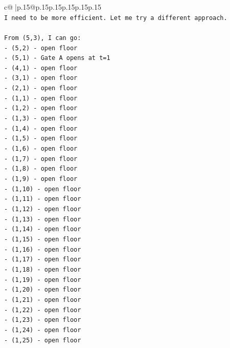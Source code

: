 \documentclass{article}
\begin{document}
{\begin{supertabular}{c@{$\;$}|p{.15\linewidth}@{}p{.15\linewidth}p{.15\linewidth}p{.15\linewidth}p{.15\linewidth}p{.15\linewidth}}
{{{\\ 
\texttt{I need to be more efficient. Let me try a different approach.} \\
\\ 
\texttt{From (5,3), I can go:} \\
\texttt{{-} (5,2) {-} open floor} \\
\texttt{{-} (5,1) {-} Gate A opens at t=1} \\
\texttt{{-} (4,1) {-} open floor} \\
\texttt{{-} (3,1) {-} open floor} \\
\texttt{{-} (2,1) {-} open floor} \\
\texttt{{-} (1,1) {-} open floor} \\
\texttt{{-} (1,2) {-} open floor} \\
\texttt{{-} (1,3) {-} open floor} \\
\texttt{{-} (1,4) {-} open floor} \\
\texttt{{-} (1,5) {-} open floor} \\
\texttt{{-} (1,6) {-} open floor} \\
\texttt{{-} (1,7) {-} open floor} \\
\texttt{{-} (1,8) {-} open floor} \\
\texttt{{-} (1,9) {-} open floor} \\
\texttt{{-} (1,10) {-} open floor} \\
\texttt{{-} (1,11) {-} open floor} \\
\texttt{{-} (1,12) {-} open floor} \\
\texttt{{-} (1,13) {-} open floor} \\
\texttt{{-} (1,14) {-} open floor} \\
\texttt{{-} (1,15) {-} open floor} \\
\texttt{{-} (1,16) {-} open floor} \\
\texttt{{-} (1,17) {-} open floor} \\
\texttt{{-} (1,18) {-} open floor} \\
\texttt{{-} (1,19) {-} open floor} \\
\texttt{{-} (1,20) {-} open floor} \\
\texttt{{-} (1,21) {-} open floor} \\
\texttt{{-} (1,22) {-} open floor} \\
\texttt{{-} (1,23) {-} open floor} \\
\texttt{{-} (1,24) {-} open floor} \\
\texttt{{-} (1,25) {-} open floor} \\
}}}
\end{supertabular}}
\end{document}
